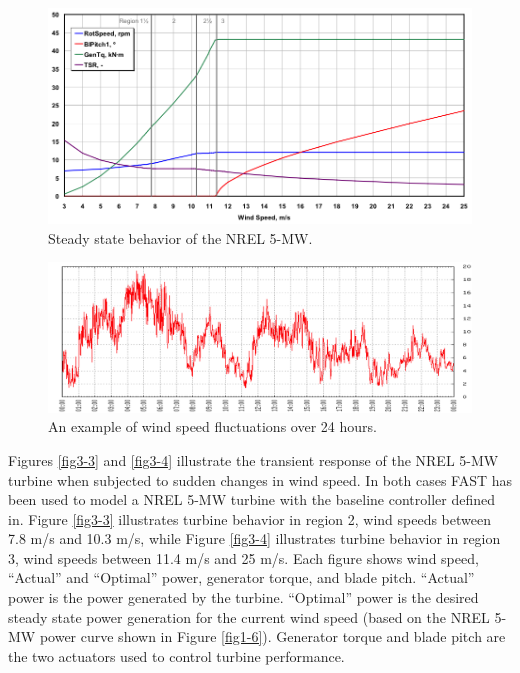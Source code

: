 \begin{figure}[htb]
	\centering
		\includegraphics[width=\linewidth]{Figures/ch2Figures/fig2-1.png}
		
	\caption{Steady state behavior of the NREL 5-MW.\cite{jonkman2009}}
	\label{fig3-1}
\end{figure}

\begin{figure}[htb]
	\centering
		\includegraphics[width=\linewidth]{Figures/ch3Figures/fig3-2.png}
		
	\caption{An example of wind speed fluctuations over 24 hours.\cite{NWTC2013}}
	\label{fig3-2}
\end{figure}

Figures  \ref{fig3-3} and  \ref{fig3-4} illustrate the transient response of the NREL 5-MW turbine when subjected to sudden changes in wind speed. In both cases FAST has been used to model a NREL 5-MW turbine with the baseline controller defined in.\cite{jonkman2009} Figure \ref{fig3-3} illustrates turbine behavior in region 2, wind speeds between 7.8 m/s and 10.3 m/s, while Figure \ref{fig3-4} illustrates turbine behavior in region 3, wind speeds between 11.4 m/s and 25 m/s.  Each figure shows wind speed, ``Actual'' and ``Optimal'' power, generator torque, and blade pitch. ``Actual'' power is the power generated by the turbine. ``Optimal'' power is the desired steady state power generation for the current wind speed (based on the NREL 5-MW power curve shown in Figure \ref{fig1-6}). Generator torque and blade pitch are the two actuators used to control turbine performance. 


